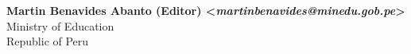 \begin{center}
\textbf{Martin Benavides Abanto (Editor) <\textit{martinbenavides@minedu.gob.pe}>}\\ 
Ministry of Education\\
Republic of Peru \\
\end{center}